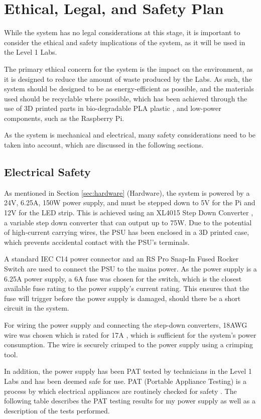 \section{Ethical, Legal, and Safety Plan} \label{sec:els}
While the system has no legal considerations at this stage, it is important to consider the ethical and safety implications of the system,
as it will be used in the Level 1 Labs.

The primary ethical concern for the system is the impact on the environment, as it is designed to reduce the amount of waste produced by the Labs. As such, the system should be designed to be as energy-efficient as possible, and the materials used should be recyclable where possible,
which has been achieved through the use of 3D printed parts in bio-degradable PLA plastic \cite{Ranakoti2022}, and low-power components, such as the Raspberry Pi.

As the system is mechanical and electrical, many safety considerations need to be taken into account, which are discussed in the following sections.
\subsection{Electrical Safety}
As mentioned in Section \ref{sec:hardware} (Hardware), the system is powered by a 24V, 6.25A, 150W power supply, and must be stepped down to 5V for the Pi and 12V for the LED strip. This is achieved using an XL4015 Step Down Converter \cite{xl4015}, a variable step down converter that can output up to 75W.
Due to the potential of high-current carrying wires, the PSU has been enclosed in a 3D printed case, which prevents accidental contact with the PSU's terminals.

A standard IEC C14 power connector and an RS Pro Snap-In Fused Rocker Switch \cite{rsproc14switch} are used to connect the PSU to the mains power.
As the power supply is a 6.25A power supply, a 6A fuse was chosen for the switch, which is the closest available fuse rating to the power supply's
current rating. This ensures that the fuse will trigger before the power supply is damaged, should there be a short circuit in the system.

For wiring the power supply and connecting the step-down converters, 18AWG wire was chosen which is rated for 17A \cite{18awgwire}, which is sufficient
for the system's power consumption. The wire is securely crimped to the power supply using a crimping tool.

In addition, the power supply has been PAT tested by technicians in the Level 1 Labs and has been deemed safe for use.
PAT (Portable Appliance Testing) is a process by which electrical appliances are routinely checked for safety \cite{patwiki} \cite{patspec}.
The following table describes the PAT testing results for my power supply as well as a description of the tests performed.

